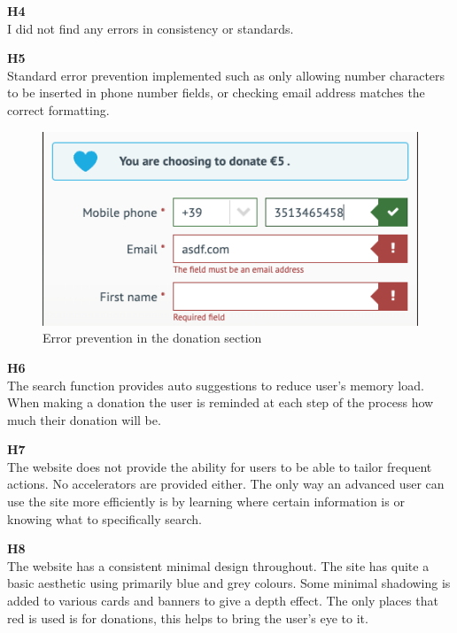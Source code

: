 \begin{description}
    \item {\textbf{H4} \color{unicefGray}{Consistency and standards}}\\
	I did not find any errors in consistency or standards.    
    \newpage
    \item {\textbf{H5} \color{unicefGray}{Error prevention}}\\
    Standard error prevention implemented such as only allowing number characters to be inserted in phone number fields, or checking email address matches the correct formatting. 
    \begin{figure}[htp!]
        \centering
        \includegraphics[scale=0.7]{Resources/Harry/Harry_H5.png}
        \caption{Error prevention in the donation section}
    \end{figure}
    \item {\textbf{H6} \color{unicefGray}{Recognition rather than recall}}\\
    The search function provides auto suggestions to reduce user’s memory load. When making a donation the user is reminded at each step of the process how much their donation will be. 
    \item {\textbf{H7} \color{unicefGray}{Flexibility and efficiency of use}}\\
    The website does not provide the ability for users to be able to tailor frequent actions. No accelerators are provided either. The only way an advanced user can use the site more efficiently is by learning where certain information is or knowing what to specifically search. 
    \item {\textbf{H8} \color{unicefGray}{Aesthetic and minimalist design}}\\
    The website has a consistent minimal design throughout. The site has quite a basic aesthetic using primarily blue and grey colours. Some minimal shadowing is added to various cards and banners to give a depth effect. The only places that red is used is for donations, this helps to bring the user’s eye to it. 

\end{description}
